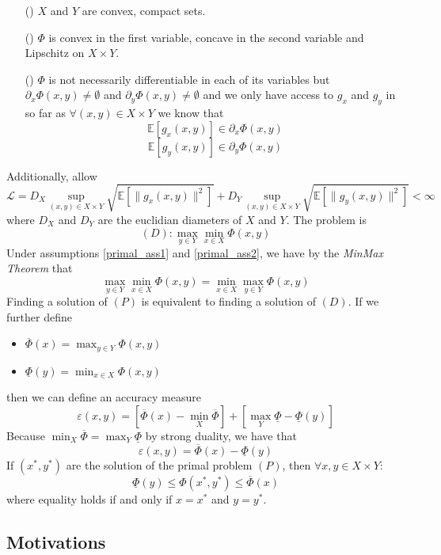 \documentclass[12pt,reqno]{amsart}
\numberwithin{equation}{section}
\newcommand{\eqnum}{\refstepcounter{equation}\textup{(\tagform{\theequation})}}
\begin{document}
\begin{itemize}
\item[\eqnum\label{primal_ass1}] $X$ and $Y$ are convex, compact sets.
\item[ \eqnum\label{primal_ass2}] $\Phi$ is convex in the first variable, concave in the second variable and Lipschitz on $X \times Y$.
\item[ \eqnum\label{primal_ass3}] $\Phi$ is not necessarily differentiable in each of its variables but $\partial_{x} \Phi(x,y) \neq  \emptyset $ and $\partial_{y} \Phi(x,y) \neq  \emptyset $
and we only have access to $g_{x}$ and $g_{y}$ in so far as $\forall (x,y) \in X \times Y$ we know that
$$\mathbb{E}[g_{x}(x,y)] \in \partial_{x} \Phi(x,y) $$
$$\mathbb{E}[g_{y}(x,y)] \in \partial_{y} \Phi(x,y) $$
\end{itemize}
Additionally, allow
$$
\mathcal{L} = D_{X} \sup_{(x,y) \in X \times Y} \sqrt{\mathbb{E}[\lVert g_{x}(x,y) \rVert^{2}]}+ D_{Y} \sup_{(x,y) \in X \times Y}\sqrt{\mathbb{E}[\lVert g_{y}(x,y) \rVert^{2}]} < \infty
$$
where $D_{X}$ and $D_{Y}$ are the euclidian diameters of $X$ and $Y$. The  problem is
$$
(D): \max_{y \in Y}\min_{x \in X} \Phi(x,y)
$$
Under assumptions \ref{primal_ass1} and \ref{primal_ass2}, we have by the \emph{MinMax Theorem} that
$$
\max_{y \in Y}\min_{x \in X} \Phi(x,y) = \min_{x \in X}\max_{y \in Y} \Phi(x,y)
$$
Finding a solution of $(P)$ is equivalent to finding a solution of $(D)$. If we further define
\begin{itemize}
\item $\overline{\Phi}(x) = \max_{y \in Y}\Phi(x,y)$
\item $\underline{\Phi}(y) = \min_{x \in X}\Phi(x,y)$
\end{itemize}
then we can define an accuracy measure
$$
\varepsilon(x,y) = [\overline{\Phi}(x) - \min_{X}\overline{\Phi}] + [\max_{Y}\underline{\Phi} - \underline{\Phi}(y)]
$$
Because $\min_{X}\overline{\Phi} = \max_{Y}\underline{\Phi}$ by strong duality, we have that
$$
\varepsilon(x,y) = \overline{\Phi}(x) - \underline{\Phi}(y)
$$
If $(x^{*},y^{*})$ are the solution of the primal problem $(P)$, then $\forall x, y \in X \times Y$:
$$
\underline{\Phi}(y) \leq \Phi(x^{*},y^{*}) \leq \overline{\Phi}(x)
$$
where equality holds if and only if $x = x^{*}$ and $y = y^{*}$.

\subsection{Motivations}
\end{document}
